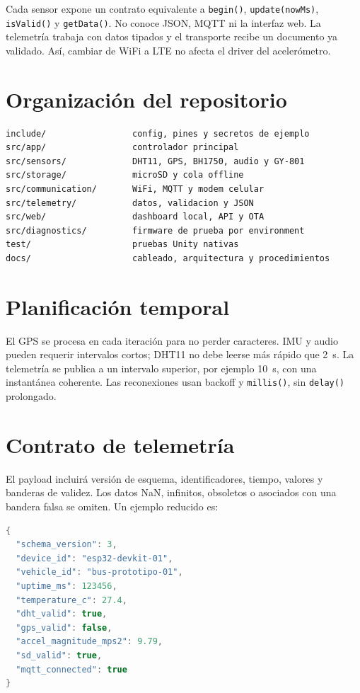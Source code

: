 \documentclass[11pt,a4paper,oneside]{report}
\begin{document}
Cada sensor expone un contrato equivalente a \texttt{begin()},
\texttt{update(nowMs)}, \texttt{isValid()} y \texttt{getData()}. No conoce JSON,
MQTT ni la interfaz web. La telemetría trabaja con datos tipados y el transporte
recibe un documento ya validado. Así, cambiar de WiFi a LTE no afecta el driver del
acelerómetro.

\section{Organización del repositorio}
\begin{lstlisting}
include/                 config, pines y secretos de ejemplo
src/app/                 controlador principal
src/sensors/             DHT11, GPS, BH1750, audio y GY-801
src/storage/             microSD y cola offline
src/communication/       WiFi, MQTT y modem celular
src/telemetry/           datos, validacion y JSON
src/web/                 dashboard local, API y OTA
src/diagnostics/         firmware de prueba por environment
test/                    pruebas Unity nativas
docs/                    cableado, arquitectura y procedimientos
\end{lstlisting}

\section{Planificación temporal}
El GPS se procesa en cada iteración para no perder caracteres. IMU y audio pueden
requerir intervalos cortos; DHT11 no debe leerse más rápido que 2~s. La telemetría se
publica a un intervalo superior, por ejemplo 10~s, con una instantánea coherente. Las
reconexiones usan backoff y \texttt{millis()}, sin \texttt{delay()} prolongado.

\section{Contrato de telemetría}
El payload incluirá versión de esquema, identificadores, tiempo, valores y banderas de
validez. Los datos NaN, infinitos, obsoletos o asociados con una bandera falsa se
omiten. Un ejemplo reducido es:

\begin{lstlisting}[language={C++}]
{
  "schema_version": 3,
  "device_id": "esp32-devkit-01",
  "vehicle_id": "bus-prototipo-01",
  "uptime_ms": 123456,
  "temperature_c": 27.4,
  "dht_valid": true,
  "gps_valid": false,
  "accel_magnitude_mps2": 9.79,
  "sd_valid": true,
  "mqtt_connected": true
}
\end{lstlisting}
\end{document}

